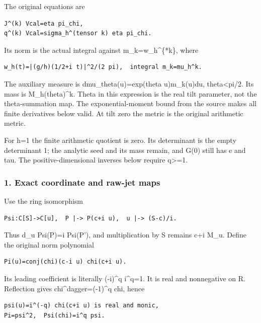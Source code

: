 The original equations are

\begin{verbatim}
J^(k) Vcal=eta pi_chi,
q^(k) Vcal=sigma_h^(tensor k) eta pi_chi.
\end{verbatim}

Its norm is the actual integral against m\_k=w\_h\^{}\{*k\}, where

\begin{verbatim}
w_h(t)=|(g/h)(1/2+i t)|^2/(2 pi),  integral m_k=mu_h^k.
\end{verbatim}

The auxiliary measure is dmu\_theta(u)=exp(theta u)m\_k(u)du, \textbar theta\textbar\textless pi/2. Its mass is M\_h(theta)\^{}k. Theta in this expression is the real tilt parameter, not the theta-summation map. The exponential-moment bound from the source makes all finite derivatives below valid. At tilt zero the metric is the original arithmetic metric.

For h=1 the finite arithmetic quotient is zero. Its determinant is the empty determinant 1; the analytic seed and its mass remain, and G(0) still has e and tau. The positive-dimensional inverses below require q\textgreater=1.

\subsubsection{1. Exact coordinate and raw-jet maps}\label{endpoint-pr24_current_corrected--exact-coordinate-and-raw-jet-maps}

Use the ring isomorphism

\begin{verbatim}
Psi:C[S]->C[u],  P |-> P(c+i u),  u |-> (S-c)/i.
\end{verbatim}

Thus d\_u Psi(P)=i Psi(P'), and multiplication by S remains c+i M\_u. Define the original norm polynomial

\begin{verbatim}
Pi(u)=conj(chi)(c-i u) chi(c+i u).
\end{verbatim}

Its leading coefficient is literally (-i)\^{}q i\^{}q=1. It is real and nonnegative on R. Reflection gives chi\^{}dagger=(-1)\^{}q chi, hence

\begin{verbatim}
psi(u)=i^(-q) chi(c+i u) is real and monic,
Pi=psi^2,  Psi(chi)=i^q psi.
\end{verbatim}

